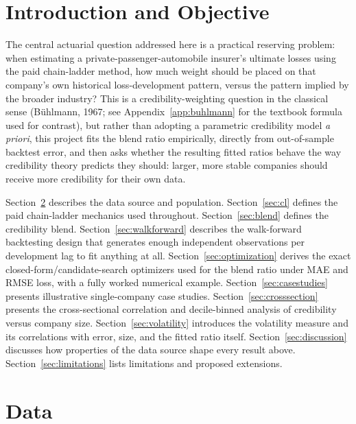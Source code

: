 \documentclass[11pt]{article}
\begin{document}
\tableofcontents

\section{Introduction and Objective}

The central actuarial question addressed here is a practical reserving problem: when estimating
a private-passenger-automobile insurer's ultimate losses using the paid chain-ladder method, how
much weight should be placed on that company's own historical loss-development pattern, versus
the pattern implied by the broader industry? This is a credibility-weighting question in the
classical sense (B\"uhlmann, 1967; see Appendix~\ref{app:buhlmann} for the textbook formula used
for contrast), but rather than adopting a parametric credibility model \emph{a priori}, this
project fits the blend ratio empirically, directly from out-of-sample backtest error, and then
asks whether the resulting fitted ratios behave the way credibility theory predicts they should:
larger, more stable companies should receive more credibility for their own data.

Section~\ref{sec:data} describes the data source and population. Section~\ref{sec:cl} defines the
paid chain-ladder mechanics used throughout. Section~\ref{sec:blend} defines the credibility blend.
Section~\ref{sec:walkforward} describes the walk-forward backtesting design that generates enough
independent observations per development lag to fit anything at all. Section~\ref{sec:optimization}
derives the exact closed-form/candidate-search optimizers used for the blend ratio under MAE and
RMSE loss, with a fully worked numerical example. Section~\ref{sec:casestudies} presents
illustrative single-company case studies. Section~\ref{sec:crosssection} presents the cross-sectional
correlation and decile-binned analysis of credibility versus company size. Section~\ref{sec:volatility}
introduces the volatility measure and its correlations with error, size, and the fitted ratio itself.
Section~\ref{sec:discussion} discusses how properties of the data source shape every result above.
Section~\ref{sec:limitations} lists limitations and proposed extensions.

\section{Data}
\label{sec:data}
\end{document}
